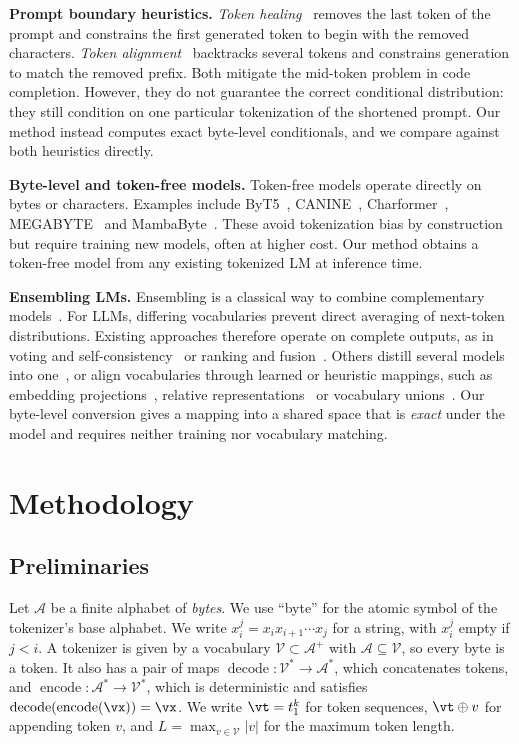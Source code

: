\documentclass{article} %
\newcommand{\enc}{\operatorname{encode}}
\newcommand{\dec}{\operatorname{decode}}
\newcommand{\vocab}{\mathcal{V}}
\newcommand{\alphabet}{\mathcal{A}}
\begin{document}
\textbf{Prompt boundary heuristics.}
\emph{Token healing}~\citep{dagan2024getting} removes the last token of the prompt and constrains the first generated token to begin with the removed characters. \emph{Token alignment}~\citep{athiwaratkun2024token} backtracks several tokens and constrains generation to match the removed prefix. Both mitigate the mid-token problem in code completion. However, they do not guarantee the correct conditional distribution: they still condition on one particular tokenization of the shortened prompt. Our method instead computes exact byte-level conditionals, and we compare against both heuristics directly.

\textbf{Byte-level and token-free models.}
Token-free models operate directly on bytes or characters. Examples include ByT5~\citep{xue2022byt5}, CANINE~\citep{clark2022canine}, Charformer~\citep{tay2022charformer}, MEGABYTE~\citep{yu2023megabyte} and MambaByte~\citep{wang2024mambabyte}. These avoid tokenization bias by construction but require training new models, often at higher cost. Our method obtains a token-free model from any existing tokenized LM at inference time.

\textbf{Ensembling LMs.}
Ensembling is a classical way to combine complementary models~\citep{dietterich2000ensemble,jacobs1991adaptive,shazeer2017outrageously}. For LLMs, differing vocabularies prevent direct averaging of next-token distributions. Existing approaches therefore operate on complete outputs, as in voting and self-consistency~\citep{wang2023selfconsistency} or ranking and fusion~\citep{jiang2023llmblender}. Others distill several models into one~\citep{wan2024knowledge}, or align vocabularies through learned or heuristic mappings, such as embedding projections~\citep{xu2024bridging}, relative representations~\citep{huang2024ensemble} or vocabulary unions~\citep{yu2024breaking}. Our byte-level conversion gives a mapping into a shared space that is \emph{exact} under the model and requires neither training nor vocabulary matching.

\section{Methodology}
\label{sec:method}
\subsection{Preliminaries}
\label{sec:prelim}
Let $\alphabet$ be a finite alphabet of \emph{bytes}. We use ``byte'' for the atomic symbol of the tokenizer's base alphabet. We write $x_i^j = x_i x_{i+1}\cdots x_j$ for a string, with $x_i^j$ empty if $j<i$. A tokenizer is given by a vocabulary $\vocab \subset \alphabet^+$ with $\alphabet \subseteq \vocab$, so every byte is a token. It also has a pair of maps $\dec: \vocab^* \to \alphabet^*$, which concatenates tokens, and $\enc: \alphabet^* \to \vocab^*$, which is deterministic and satisfies $\dec(\enc(\vx)) = \vx$. We write $\vt = t_1^k$ for token sequences, $\vt \oplus v$ for appending token $v$, and $L = \max_{v\in\vocab}|v|$ for the maximum token length.
\end{document}
